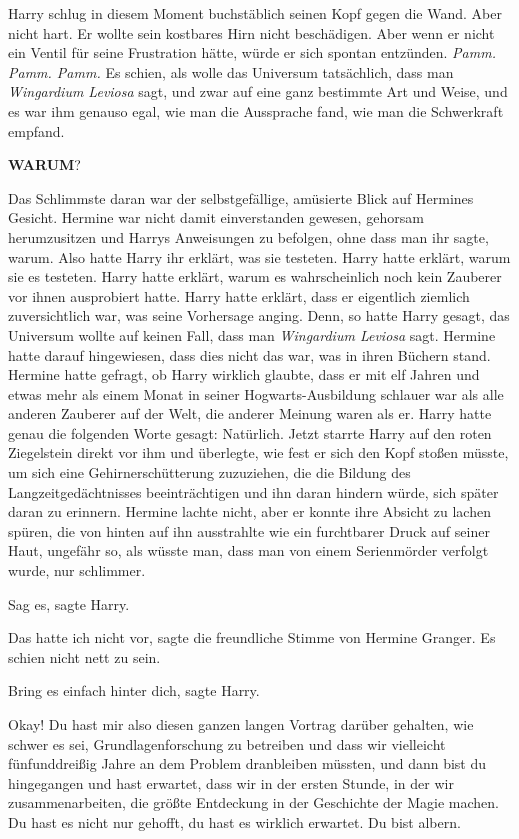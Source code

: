 Harry schlug in diesem Moment buchstäblich seinen Kopf gegen die Wand. Aber
nicht hart. Er wollte sein kostbares Hirn nicht beschädigen. Aber wenn er nicht
ein Ventil für seine Frustration hätte, würde er sich spontan entzünden.
\emph{Pamm. Pamm. Pamm. } Es schien, als wolle das Universum tatsächlich, dass
man \glqq \emph{Wingardium Leviosa\grqq{} } sagt, und zwar auf eine ganz
bestimmte Art und Weise, und es war ihm genauso egal, wie man die Aussprache
fand, wie man die Schwerkraft empfand.

\textbf{WARUM}?

Das Schlimmste daran war der selbstgefällige, amüsierte Blick auf Hermines
Gesicht. Hermine war nicht damit einverstanden gewesen, gehorsam herumzusitzen
und Harrys Anweisungen zu befolgen, ohne dass man ihr sagte, warum. Also hatte
Harry ihr erklärt, was sie testeten. Harry hatte erklärt, warum sie es testeten.
Harry hatte erklärt, warum es wahrscheinlich noch kein Zauberer vor ihnen
ausprobiert hatte. Harry hatte erklärt, dass er eigentlich ziemlich
zuversichtlich war, was seine Vorhersage anging. Denn, so hatte Harry gesagt,
das Universum wollte auf keinen Fall, dass man \emph{\glqq Wingardium
Leviosa\grqq{} } sagt. Hermine hatte darauf hingewiesen, dass dies nicht das
war, was in ihren Büchern stand. Hermine hatte gefragt, ob Harry wirklich
glaubte, dass er mit elf Jahren und etwas mehr als einem Monat in seiner
Hogwarts-Ausbildung schlauer war als alle anderen Zauberer auf der Welt, die
anderer Meinung waren als er. Harry hatte genau die folgenden Worte gesagt:
\glqq Natürlich.\grqq{} Jetzt starrte Harry auf den roten Ziegelstein direkt vor
ihm und überlegte, wie fest er sich den Kopf stoßen müsste, um sich eine
Gehirnerschütterung zuzuziehen, die die Bildung des Langzeitgedächtnisses
beeinträchtigen und ihn daran hindern würde, sich später daran zu erinnern.
Hermine lachte nicht, aber er konnte ihre Absicht zu lachen spüren, die von
hinten auf ihn ausstrahlte wie ein furchtbarer Druck auf seiner Haut, ungefähr
so, als wüsste man, dass man von einem Serienmörder verfolgt wurde, nur
schlimmer.

\glqq Sag es\grqq{}, sagte Harry.

\glqq Das hatte ich nicht vor\grqq{}, sagte die freundliche Stimme von Hermine
Granger. \glqq Es schien nicht nett zu sein.\grqq{}

\glqq Bring es einfach hinter dich\grqq{}, sagte Harry.

\glqq Okay! Du hast mir also diesen ganzen langen Vortrag darüber gehalten, wie
schwer es sei, Grundlagenforschung zu betreiben und dass wir vielleicht
fünfunddreißig Jahre an dem Problem dranbleiben müssten, und dann bist du
hingegangen und hast erwartet, dass wir in der ersten Stunde, in der wir
zusammenarbeiten, die größte Entdeckung in der Geschichte der Magie machen. Du
hast es nicht nur gehofft, du hast es wirklich erwartet. Du bist albern.\grqq{}


